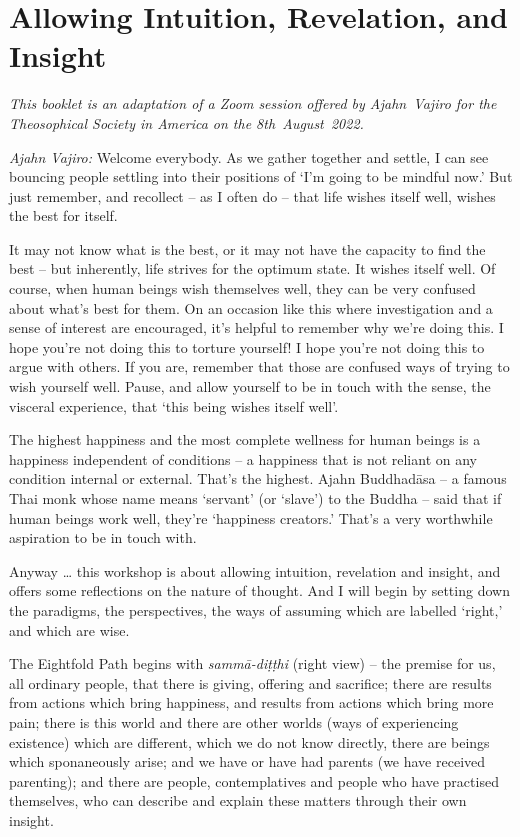 \chapter{Allowing Intuition, Revelation, and Insight}

{\centering
\begin{minipage}{0.8\linewidth}%
\centering\itshape
This booklet is an adaptation of a Zoom session offered by Ajahn~Vajiro
for the Theosophical Society in America on the 8th~August~2022.
\end{minipage}
\par}


\bigskip

\emph{Ajahn Vajiro:} Welcome everybody. As we gather together and settle, I can
see bouncing people settling into their positions of `I'm going to be mindful
now.' But just remember, and recollect -- as I often do -- that life wishes
itself well, wishes the best for itself.

It may not know what is the best, or it may not have the capacity to find the
best -- but inherently, life strives for the optimum state. It wishes itself
well. Of course, when human beings wish themselves well, they can be very
confused about what's best for them. On an occasion like this where
investigation and a sense of interest are encouraged, it's helpful to remember
why we're doing this. I hope you're not doing this to torture yourself! I hope
you're not doing this to argue with others. If you are, remember that those
are confused ways of trying to wish yourself well. Pause, and allow yourself to
be in touch with the sense, the visceral experience, that `this being wishes
itself well'.

The highest happiness and the most complete wellness for human beings is a
happiness independent of conditions -- a happiness that is not reliant on any
condition internal or external. That's the highest. Ajahn Buddhadāsa -- a famous
Thai monk whose name means `servant' (or `slave') to the Buddha -- said that if
human beings work well, they're `happiness creators.' That's a very worthwhile
aspiration to be in touch with.

Anyway \ldots{} this workshop is about allowing intuition, revelation and
insight, and offers some reflections on the nature of thought. And I will begin
by setting down the paradigms, the perspectives, the ways of assuming which are
labelled `right,' and which are wise.

The Eightfold Path begins with \emph{sammā-diṭṭhi} (right view) -- the premise
for us, all ordinary people, that there is giving, offering and sacrifice; there
are results from actions which bring happiness, and results from actions which
bring more pain; there is this world and there are other worlds (ways of
experiencing existence) which are different, which we do not know directly, there are beings which sponaneously arise; and
we have or have had parents (we have received parenting); and there are people, contemplatives and people who
have practised themselves, who can describe and explain these matters through
their own insight.

